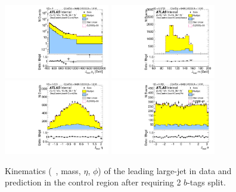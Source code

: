 \clearpage

\begin{figure}[htb!]
\begin{center}
\includegraphics[width=0.41\textwidth,angle=-90]{figures/boosted/Control/b77_TwoTag_split_Control_leadHCand_Pt_m_1.pdf}
\includegraphics[width=0.41\textwidth,angle=-90]{figures/boosted/Control/b77_TwoTag_split_Control_leadHCand_Mass_s.pdf}\\
\includegraphics[width=0.41\textwidth,angle=-90]{figures/boosted/Control/b77_TwoTag_split_Control_leadHCand_Eta.pdf}
\includegraphics[width=0.41\textwidth,angle=-90]{figures/boosted/Control/b77_TwoTag_split_Control_leadHCand_Phi.pdf}
  \caption{Kinematics (\pt~, mass, $\eta$, $\phi$) of the leading large-\R jet in data and prediction in the control region after requiring 2 $b$-tags split. }
  \label{fig:boosted-2bs-control-ak10-lead}
\end{center}
\end{figure}

